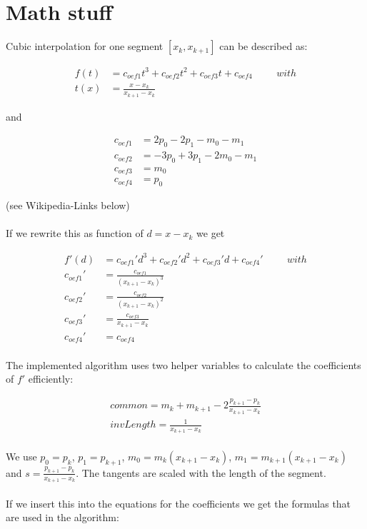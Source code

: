 \documentclass[a4paper]{article}
\begin{document}
\section{Math stuff}

Cubic interpolation for one segment $[x_k, x_{k+1}]$ can be described as:

\begin{equation*}
	\begin{aligned}
		f(t) &= c_{oef1}t^3 + c_{oef2}t^2 + c_{oef3}t + c_{oef4}  \hspace{1cm} with \\
		t(x) &= \frac{x - x_k}{x_{k+1} - x_k}
	\end{aligned}
\end{equation*}

\hspace{1cm} and

\begin{equation*}
	\begin{aligned}
		c_{oef1} &= 2p_0 - 2p_1 - m_0 - m_1 \\
		c_{oef2} &= -3p_0 + 3p_1 - 2m_0 - m_1 \\
		c_{oef3} &= m_0 \\
		c_{oef4} &= p_0
	\end{aligned}
\end{equation*}


(see Wikipedia-Links below)\\
\\
If we rewrite this as function of $d = x - x_k$ we get

\begin{equation*}
	\begin{aligned}
		f'(d) &= c_{oef1}' d^3 + c_{oef2}' d^2 + c_{oef3}' d + c_{oef4}' \hspace{1cm} with \\
		c_{oef1}' &= \frac{c_{oef1}}{(x_{k+1} - x_k)^3} \\
        c_{oef2}' &= \frac{c_{oef2}}{(x_{k+1} - x_k)^2} \\
        c_{oef3}' &= \frac{c_{oef3}}{x_{k+1} - x_k} \\
        c_{oef4}' &= c_{oef4}
    \end{aligned}
\end{equation*}
\\
The implemented algorithm uses two helper variables to calculate the coefficients of $f'$ efficiently:

\begin{equation*}
	\begin{aligned}
		common = m_k + m_{k+1} - 2 \frac{p_{k+1} - p_k}{x_{k+1} - x_k} \\
		invLength = \frac{1}{x_{k+1} - x_k}
    \end{aligned}
\end{equation*}
\\
We use $p_0 = p_k$, $p_1 = p_{k+1}$, $m_0 = m_k (x_{k+1} - x_k)$, $m_1 = m_{k+1} (x_{k+1} - x_k)$ and $s = \frac{p_{k+1}-p_k}{x_{k+1}-x_k}$. The tangents are scaled with the length of the segment. \\
\\
If we insert this into the equations for the coefficients we get the formulas that are used in the algorithm:
\end{document}
